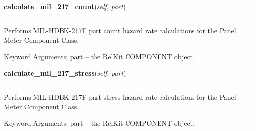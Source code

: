     \label{reliafree:meters:meter:Panel:calculate_mil_217_count}

    \vspace{0.5ex}

\hspace{.8\funcindent}\begin{boxedminipage}{\funcwidth}

    \raggedright \textbf{calculate\_mil\_217\_count}(\textit{self}, \textit{part})

    \vspace{-1.5ex}

    \rule{\textwidth}{0.5\fboxrule}
\setlength{\parskip}{2ex}
    Performs MIL-HDBK-217F part count hazard rate calculations for the 
    Panel Meter Component Class.

    Keyword Arguments: part -- the RelKit COMPONENT object.

\setlength{\parskip}{1ex}
    \end{boxedminipage}

    \label{reliafree:meters:meter:Panel:calculate_mil_217_stress}

    \vspace{0.5ex}

\hspace{.8\funcindent}\begin{boxedminipage}{\funcwidth}

    \raggedright \textbf{calculate\_mil\_217\_stress}(\textit{self}, \textit{part})

    \vspace{-1.5ex}

    \rule{\textwidth}{0.5\fboxrule}
\setlength{\parskip}{2ex}
    Performs MIL-HDBK-217F part stress hazard rate calculations for the 
    Panel Meter Component Class.

    Keyword Arguments: part -- the RelKit COMPONENT object.

\setlength{\parskip}{1ex}
    \end{boxedminipage}

